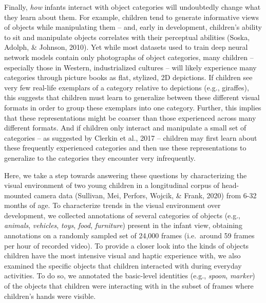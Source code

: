 \documentclass[10pt, letterpaper]{article}
\begin{document}
Finally, \emph{how} infants interact with object categories will
undoubtedly change what they learn about them. For example, children
tend to generate informative views of objects while manipulating them --
and, early in development, children's ability to sit and manipulate
objects correlates with their perceptual abilities (Soska, Adolph, \&
Johnson, 2010). Yet while most datasets used to train deep neural
network models contain only photographs of object categories, many
children -- especially those in Western, industrialized cultures -- will
likely experience many categories through picture books as flat,
stylized, 2D depictions. If children see very few real-life exemplars of
a category relative to depictions (e.g., giraffes), this suggests that
children must learn to generalize between these different visual formats
in order to group these exemplars into one category. Further, this
implies that these representations might be coarser than those
experienced across many different formats. And if children only interact
and manipulate a small set of categories -- as suggested by Clerkin et
al., 2017 -- children may first learn about these frequently experienced
categories and then use these representations to generalize to the
categories they encounter very infrequently.

Here, we take a step towards answering these questions by characterizing
the visual environment of two young children in a longitudinal corpus of
head-mounted camera data (Sullivan, Mei, Perfors, Wojcik, \& Frank,
2020) from 6-32 months of age. To characterize trends in the visual
environment over development, we collected annotations of several
categories of objects (e.g., \emph{animals}, \emph{vehicles},
\emph{toys}, \emph{food}, \emph{furniture}) present in the infant view,
obtaining annotations on a randomly sampled set of 24,000 frames
(i.e.~around 59 frames per hour of recorded video). To provide a closer
look into the kinds of objects children have the most intensive visual
and haptic experience with, we also examined the specific objects that
children interacted with during everyday activities. To do so, we
annotated the basic-level identities (e.g., \emph{spoon}, \emph{marker})
of the objects that children were interacting with in the subset of
frames where children's hands were visible.
\end{document}
